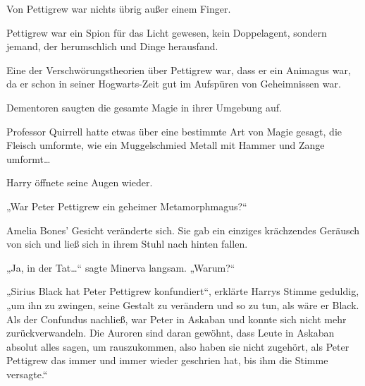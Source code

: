 Von Pettigrew war nichts übrig außer einem Finger.

Pettigrew war ein Spion für das Licht gewesen, kein Doppelagent, sondern jemand, der herumschlich und Dinge herausfand.

Eine der Verschwörungstheorien über Pettigrew war, dass er ein Animagus war, da er schon in seiner Hogwarts-Zeit gut im Aufspüren von Geheimnissen war.

Dementoren saugten die gesamte Magie in ihrer Umgebung auf.

Professor Quirrell hatte etwas über eine bestimmte Art von Magie gesagt, die Fleisch umformte, wie ein Muggelschmied Metall mit Hammer und Zange umformt…

Harry öffnete seine Augen wieder.

„War Peter Pettigrew ein geheimer Metamorphmagus?“

Amelia Bones' Gesicht veränderte sich. Sie gab ein einziges krächzendes Geräusch von sich und ließ sich in ihrem Stuhl nach hinten fallen.

„Ja, in der Tat…“ sagte Minerva langsam. „Warum?“

„Sirius Black hat Peter Pettigrew konfundiert“, erklärte Harrys Stimme geduldig,
„um ihn zu zwingen, seine Gestalt zu verändern und so zu tun, als wäre er Black. Als der Confundus nachließ, war Peter in Askaban und konnte sich nicht mehr zurückverwandeln. Die Auroren sind daran gewöhnt, dass Leute in Askaban absolut alles sagen, um rauszukommen, also haben sie nicht zugehört, als Peter Pettigrew das immer und immer wieder geschrien hat, bis ihm die Stimme versagte.“

